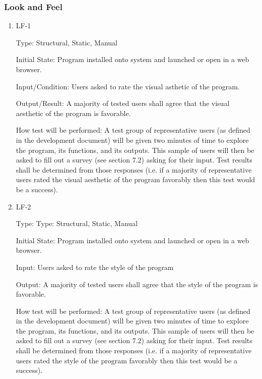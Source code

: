\documentclass[12pt, titlepage]{article}
\begin{document}
\subsubsection{Look and Feel}

\begin{enumerate}

\item{LF-1\\}

Type: Structural, Static, Manual
					
Initial State: Program installed onto system and launched or open in a web browser.
					
Input/Condition: Users asked to rate the visual asthetic of the program.
					
Output/Result: A majority of tested users shall agree that the visual aesthetic of the program is favorable.
					
How test will be performed: A test group of representative users (as defined in the development document) will be given two minutes of time to explore the program, its functions, and its outputs. This sample of users will then be asked to fill out a survey (see section 7.2) asking for their input. Test results shall be determined from those responses (i.e. if a majority of representative users rated the visual aesthetic of the program favorably then this test would be a success).
					
\item{LF-2\\}

Type: Type: Structural, Static, Manual
					
Initial State: Program installed onto system and launched or open in a web browser.
					
Input: Users asked to rate the style of the program
					
Output: A majority of tested users shall agree that the style of the program is favorable.
					
How test will be performed: A test group of representative users (as defined in the development document) will be given two minutes of time to explore the program, its functions, and its outputs. This sample of users will then be asked to fill out a survey (see section 7.2) asking for their input. Test results shall be determined from those responses (i.e. if a majority of representative users rated the style of the program favorably then this test would be a success).

\end{enumerate}
\end{document}
